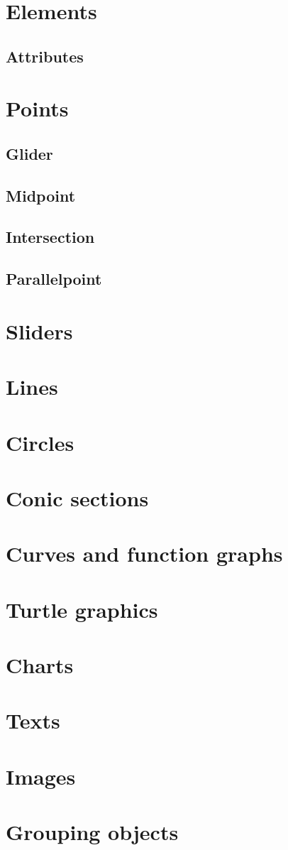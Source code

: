 \chapter{Elements}
\label{ch:elements}

\section{Attributes}\label{sec:attributes}

\chapter{Points}\label{ch:points}
\section{Glider}
\section{Midpoint}
\section{Intersection}
\section{Parallelpoint}

\chapter{Sliders}\label{ch:sliders}
\chapter{Lines}\label{ch:lines}
\chapter{Circles}\label{ch:circles}
\chapter{Conic sections}\label{ch:conics}
\chapter{Curves and function graphs}\label{ch:curves}
\chapter{Turtle graphics}\label{ch:turtle}
\chapter{Charts}\label{ch:charts}
\chapter{Texts}\label{ch:texts}
\chapter{Images}\label{ch:images}
\chapter{Grouping objects}\label{ch:groups}


